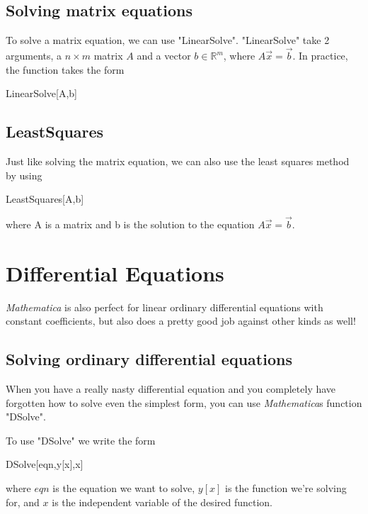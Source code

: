 \documentclass[11pt,a4paper,twoside]{article}
\begin{document}
			\subsection{Solving matrix equations}
						
				To solve a matrix equation, we can use "LinearSolve".  "LinearSolve" take 2 arguments, a $n \times m$ matrix $A$ and a vector $ b \in \mathbb{R}^m $, where $ A \vec{x} = \vec{b} $.  In practice, the function takes the form
						
				\begin{center} LinearSolve[A,b] \end{center}
						
			\subsection{LeastSquares}
						
				Just like solving the matrix equation, we can also use the least squares method by using 
						
				\begin{center} LeastSquares[A,b] \end{center} 
						
				where A is a matrix and b is the solution to the equation $A \vec{x} = \vec{b} $.
				
		\section{Differential Equations}
			
			\textit{Mathematica} is also perfect for linear ordinary differential equations with constant coefficients, but also does a pretty good job against other kinds as well!
				
			\subsection{Solving ordinary differential equations}				
						
				When you have a really nasty differential equation and you completely have forgotten how to solve even the simplest form, you can use \textit{Mathematica}s function "DSolve".
						
				To use "DSolve" we write the form
						
				\begin{center} DSolve[eqn,y[x],x] \end{center}
						
				where $eqn$ is the equation we want to solve, $y[x]$ is the function we're solving for, and $x$ is the independent variable of the desired function.
				
\end{document}
